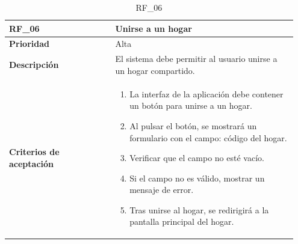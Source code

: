 \begin{table}[htb!]
    \begin{tabular}{|p{0.35\linewidth}|p{0.6\linewidth}|}
        \hline
        \rowcolor[HTML]{C0C0C0}  
        \textbf{RF\_06} & \textbf{Unirse a un hogar} \\
        \hline
        \textbf{Prioridad} & Alta \\
        \hline
        \textbf{Descripción} & El sistema debe permitir al usuario unirse a un hogar compartido.  \\
        \hline
        \vspace{0.5mm}
        \textbf{Criterios de aceptación} & 
        \begin{minipage}[t]{0.9\linewidth}
            \begin{enumerate}
                \item La interfaz de la aplicación debe contener un botón para unirse a un hogar.
                \item Al pulsar el botón, se mostrará un formulario con el campo: código del hogar.
                \item Verificar que el campo no esté vacío.
                \item Si el campo no es válido, mostrar un mensaje de error.
                \item Tras unirse al hogar, se redirigirá a la pantalla principal del hogar.
            \end{enumerate}
            \vspace{2mm}
        \end{minipage} \\
        \hline
    \end{tabular}
    \caption{RF\_06}

\end{table}

